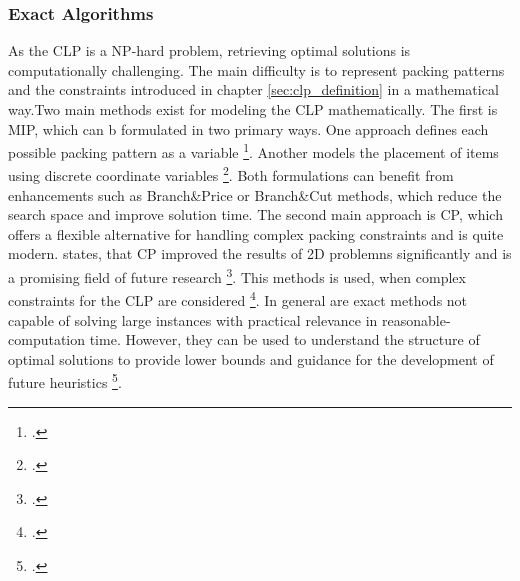 \subsubsection{Exact Algorithms}
As the \gls{CLP} is a NP-hard problem, retrieving optimal solutions is computationally
challenging. The main difficulty is to represent packing patterns and the constraints
introduced in chapter \ref{sec:clp_definition} in a mathematical way.Two main methods
exist for modeling the \gls{CLP} mathematically. The first is \gls{MIP}, which can b
formulated in two primary ways. One approach defines each possible packing pattern as
a variable \footcite[cf.][pp. 29--30]{zhu_prototype_2012}. Another models
the placement of items using discrete coordinate variables \footcite[cf.][pp. 4--8]{moura_integrated_2009}.
Both formulations can benefit from enhancements such as Branch\&Price or Branch\&Cut
methods, which reduce the search space and improve solution time.
The second main approach is \gls{CP}, which offers a flexible alternative for handling
complex packing constraints and is quite modern. \citeauthor*{iori_exact_2021} states, that
\gls{CP} improved the results of 2D problemns significantly and is a promising
field of future research  \footcite[cf.][p. 23]{iori_exact_2021}. This methods is used, when
complex constraints for the \gls{CLP} are considered \footcites[cf.][pp. 5--8]{kucuk_constraint_2022}[cf.][pp. 7--11]{tamke_branch-and-cut_2024}.
In general are exact methods not capable of solving large instances with practical relevance
in reasonable-computation time. However, they can be used to understand the structure
of optimal solutions to provide lower bounds and guidance for the development of future
heuristics \footcite[cf.][p.2]{tamke_branch-and-cut_2024}.